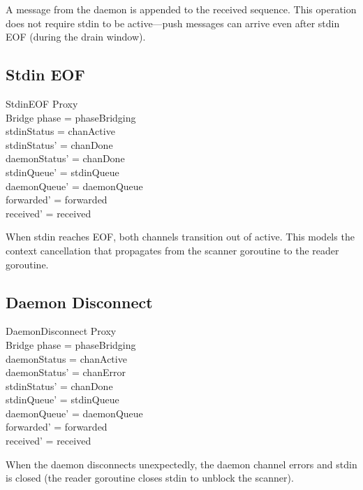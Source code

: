 \documentclass[a4paper,10pt,fleqn]{article}
\begin{document}
A message from the daemon is appended to the received sequence.
This operation does not require stdin to be active---push messages
can arrive even after stdin EOF (during the drain window).

\subsection{Stdin EOF}

\begin{schema}{StdinEOF}
  \Xi Proxy \\
  \Delta Bridge
  \where
  phase = phaseBridging \\
  stdinStatus = chanActive \\
  stdinStatus' = chanDone \\
  daemonStatus' = chanDone \\
  stdinQueue' = stdinQueue \\
  daemonQueue' = daemonQueue \\
  forwarded' = forwarded \\
  received' = received
\end{schema}

When stdin reaches EOF, both channels transition out of active.
This models the context cancellation that propagates from the scanner
goroutine to the reader goroutine.

\subsection{Daemon Disconnect}

\begin{schema}{DaemonDisconnect}
  \Xi Proxy \\
  \Delta Bridge
  \where
  phase = phaseBridging \\
  daemonStatus = chanActive \\
  daemonStatus' = chanError \\
  stdinStatus' = chanDone \\
  stdinQueue' = stdinQueue \\
  daemonQueue' = daemonQueue \\
  forwarded' = forwarded \\
  received' = received
\end{schema}

When the daemon disconnects unexpectedly, the daemon channel errors
and stdin is closed (the reader goroutine closes stdin to unblock
the scanner).
\end{document}
